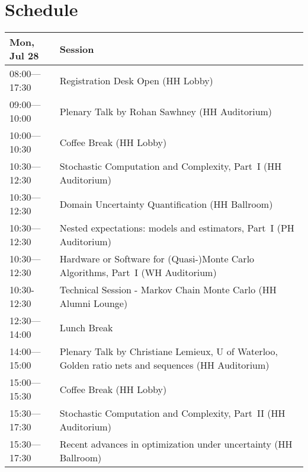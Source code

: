 \chapter{Schedule}
\begin{table}
{\footnotesize
\begin{tabularx}{\textwidth}{>{\hsize=0.32\hsize}X|>{\hsize=1.7\hsize}X}
\hline
\textbf{Mon, Jul 28} & \textbf{Session} \\
\hline
\cellcolor{\EmptyColor}08:00---17:30 & \cellcolor{\EmptyColor}Registration Desk Open (HH Lobby) \\
\cellcolor{\PlenaryColor}09:00---10:00 & \cellcolor{\PlenaryColor}Plenary Talk by Rohan Sawhney (HH Auditorium) \\
\cellcolor{\EmptyColor}10:00---10:30 & \cellcolor{\EmptyColor}Coffee Break (HH Lobby) \\
\cellcolor{\SessionTitleColor}10:30---12:30 & \cellcolor{\SessionTitleColor}Stochastic Computation and Complexity, Part~I (HH Auditorium) \\
\cellcolor{\SessionTitleColor}10:30---12:30 & \cellcolor{\SessionTitleColor}Domain Uncertainty Quantification (HH Ballroom) \\
\cellcolor{\SessionTitleColor}10:30---12:30 & \cellcolor{\SessionTitleColor}Nested expectations: models and estimators, Part~I (PH Auditorium) \\
\cellcolor{\SessionTitleColor}10:30---12:30 & \cellcolor{\SessionTitleColor}Hardware or Software for (Quasi-)Monte Carlo Algorithms, Part~I (WH Auditorium) \\
\cellcolor{\SessionLightColor}10:30-12:30 & \cellcolor{\SessionLightColor}Technical Session - Markov Chain Monte Carlo (HH Alumni Lounge) \\
\cellcolor{\EmptyColor}12:30---14:00 & \cellcolor{\EmptyColor}Lunch Break \\
\cellcolor{\PlenaryColor}14:00---15:00 & \cellcolor{\PlenaryColor}Plenary Talk by Christiane Lemieux, U of Waterloo, Golden ratio nets and sequences (HH Auditorium) \\
\cellcolor{\EmptyColor}15:00---15:30 & \cellcolor{\EmptyColor}Coffee Break (HH Lobby) \\
\cellcolor{\SessionTitleColor}15:30---17:30 & \cellcolor{\SessionTitleColor}Stochastic Computation and Complexity, Part~II (HH Auditorium) \\
\cellcolor{\SessionTitleColor}15:30---17:30 & \cellcolor{\SessionTitleColor}Recent advances in optimization under uncertainty (HH Ballroom) \\

\end{tabularx}}
\end{table}
